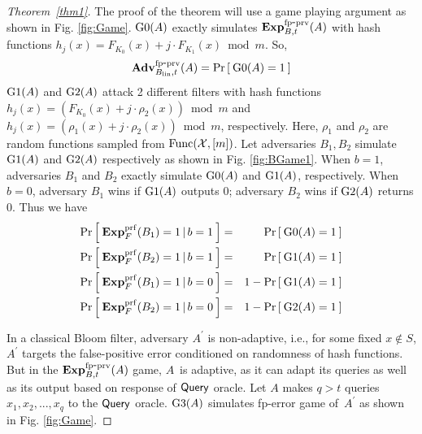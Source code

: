 \begin{proof}[Theorem~\ref{thm1}]
The proof of the theorem will use a game playing argument as shown in Fig. \ref{fig:Game}. $\text{G0}(A)$ exactly simulates $\mathrm{\mathbf{Exp}}^{\mathrm{fp\mbox{-}prv}}_{B,t}(A)$ with hash functions $h_j(x) =  F_{K_0}(x) + j\cdot F_{K_1}(x) \bmod m$. So,
\begin{equation}
\mathrm{\mathbf{Adv}}^{\mathrm{fp\mbox{-}prv}}_{B_{\mathrm{lin}},t}(A) = \Pr\left[\: \text{G0}(A)=1 \:\right]\label{eq:0}
\end{equation}
 $\text{G1}(A)$ and $\text{G2}(A)$ attack 2 different filters with hash functions 
$h_j(x) = ( F_{K_0}(x) + j\cdot \rho_2(x)) \bmod m$ and $h_j(x) = ( \rho_1(x) + j \cdot \rho_2(x)) \bmod m$, respectively.
Here, $\rho_1$ and $\rho_2$ are random functions sampled from $\mathrm{Func}({\cal X},[m])$. Let adversaries $B_1, B_2$ simulate $\text{G1}(A)$ and $\text{G2}(A)$ respectively as shown in Fig. \ref{fig:BGame1}. When $b=1$, adversaries $B_1$ and $B_2$ exactly simulate $\text{G0}(A)$ and $\text{G1}(A)$, respectively.  When $b=0$, adversary $B_1$ wins if $\text{G1}(A)$ outputs 0; adversary $B_2$ wins if $\text{G2}(A)$ returns 0.  Thus we have
\begin{eqnarray}
\Pr\left[\: \mathbf{Exp}^{\mathrm{prf}}_{F}(B_1) = 1\,|\,b=1 \:\right] &=& \Pr\left[\: \text{G0}(A)=1 \:\right]\label{eq:m1}\\
\Pr\left[\: \mathbf{Exp}^{\mathrm{prf}}_{F}(B_2) = 1\,|\,b=1 \:\right] &=& \Pr\left[\: \text{G1}(A)=1 \:\right]\label{eq:m2}\\
\Pr\left[\: \mathbf{Exp}^{\mathrm{prf}}_{F}(B_1) = 1\,|\,b=0 \:\right] &=& 1-\Pr\left[\: \text{G1}(A)=1 \:\right]\label{eq:m3}\\
\Pr\left[\: \mathbf{Exp}^{\mathrm{prf}}_{F}(B_2) = 1\,|\,b=0 \:\right] &=& 1-\Pr\left[\: \text{G2}(A)=1 \:\right]\label{eq:m4}
\end{eqnarray}

\noindent
In a classical Bloom filter, adversary $A^{'}$ is non-adaptive, i.e., for some fixed $x \notin S$, $A^{'}$ targets the false-positive error conditioned on randomness of hash functions.   But in the $\mathrm{\mathbf{Exp}}^{\mathrm{fp\mbox{-}prv}}_{B,t}(A)$ game, $A$~is adaptive, as it can adapt its queries as well as its output based on response of $\mathsf{Query}$ oracle. Let $A$ makes $q>t$ queries $x_1, x_2, ..., x_q$ to the $\mathsf{Query}$ oracle. $\text{G3}(A)$ simulates fp-error game of~$A^{'}$ as shown in Fig. \ref{fig:Game}.


\end{proof}
